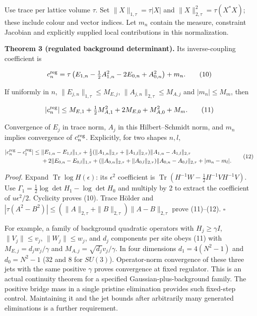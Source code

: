 \documentclass[11pt,a4paper]{article}
\begin{document}
Use trace per lattice volume \(\tau\). Set \(\|X\|_{1,\tau}=\tau|X|\)
and \(\|X\|_{2,\tau}^2=\tau(X^*X)\); these include colour and vector
indices. Let \(m_n\) contain the measure, constraint Jacobian and
explicitly supplied local contributions in this normalization.

\textbf{Theorem 3 (regulated background determinant).} Its
inverse-coupling coefficient is

\[c_n^{\rm reg}=\tau\left(E_{1,n}-\tfrac12A_{1,n}^2
                       -2E_{0,n}+A_{0,n}^2\right)+m_n. \tag{10}\]

If uniformly in \(n\), \(\|E_{j,n}\|_{1,\tau}\le M_{E,j}\),
\(\|A_{j,n}\|_{2,\tau}\le M_{A,j}\) and \(|m_n|\le M_m\), then

\[|c_n^{\rm reg}|\le M_{E,1}+\tfrac12M_{A,1}^2
                      +2M_{E,0}+M_{A,0}^2+M_m. \tag{11}\]

Convergence of \(E_j\) in trace norm, \(A_j\) in this Hilbert--Schmidt
norm, and \(m_n\) implies convergence of \(c_n^{\rm reg}\). Explicitly,
for two shapes \(n,l\),

\[\begin{aligned}
 |c_n^{\rm reg}-c_l^{\rm reg}|\le{}&
 \|E_{1,n}-E_{1,l}\|_{1,\tau}
 +\tfrac12(\|A_{1,n}\|_{2,\tau}+\|A_{1,l}\|_{2,\tau})
          \|A_{1,n}-A_{1,l}\|_{2,\tau}\\
 &+2\|E_{0,n}-E_{0,l}\|_{1,\tau}
 +(\|A_{0,n}\|_{2,\tau}+\|A_{0,l}\|_{2,\tau})
          \|A_{0,n}-A_{0,l}\|_{2,\tau}+|m_n-m_l|.
\end{aligned}\tag{12}\]

\emph{Proof.} Expand \(\operatorname{Tr}\log H(\epsilon)\): its
\(\epsilon^2\) coefficient is
\(\operatorname{Tr}(H^{-1}W-\tfrac12H^{-1}VH^{-1}V)\). Use
\(\Gamma_1=\tfrac12\log\det H_1-\log\det H_0\) and multiply by 2 to
extract the coefficient of \(u\epsilon^2/2\). Cyclicity proves (10).
Trace Hölder and
\(|\tau(A^2-B^2)|\le(\|A\|_{2,\tau}+\|B\|_{2,\tau}) \|A-B\|_{2,\tau}\)
prove (11)--(12). \(\square\)

For example, a family of background quadratic operators with
\(H_j\ge\gamma I\), \(\|V_j\|\le v_j\), \(\|W_j\|\le w_j\), and \(d_j\)
components per site obeys (11) with \(M_{E,j}=d_jw_j/\gamma\) and
\(M_{A,j}=\sqrt{d_j}v_j/\gamma\). In four dimensions \(d_1=4(N^2-1)\)
and \(d_0=N^2-1\) (32 and 8 for \(SU(3)\)). Operator-norm convergence of
these three jets with the same positive \(\gamma\) proves convergence at
fixed regulator. This is an actual continuity theorem for a specified
Gaussian-plus-background family. The positive bridge mass in a single
pristine elimination provides such fixed-step control. Maintaining it
and the jet bounds after arbitrarily many generated eliminations is a
further requirement.
\end{document}
